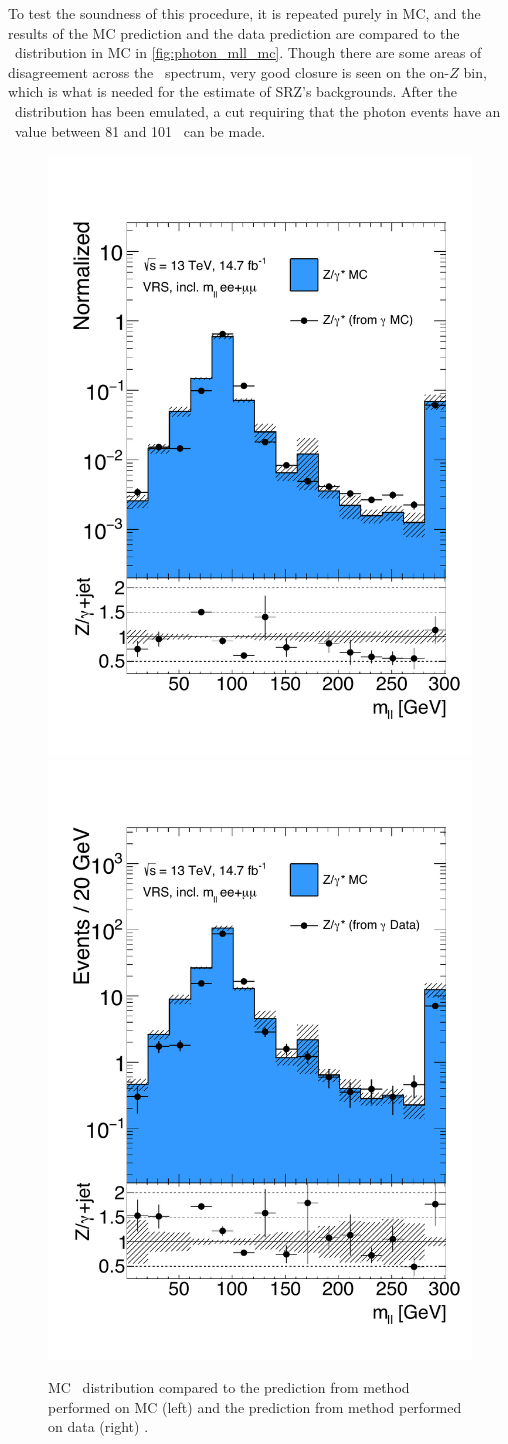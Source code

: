 To test the soundness of this procedure, it is repeated purely in \ac{MC}, and the results of the \ac{MC} prediction and the data prediction are compared to the \mll~distribution in \dyjets \ac{MC} in \autoref{fig:photon_mll_mc}. Though there are some areas of disagreement across the \mll~spectrum, very good closure is seen on the on-$Z$ bin, which is what is needed for the estimate of SRZ's backgrounds. After the \mll~distribution has been emulated, a cut requiring that the photon events have an \mll~value between 81 and 101 \gev~can be made.

\begin{centering}
\begin{figure}[!hbt]
\myfloatalign
\includegraphics[width=.45\linewidth]{figures/photons/DataMC_GJ_ee+mm_zmet_GMC.pdf}
\includegraphics[width=.45\linewidth]{figures/photons/DataMC_GJ_ee+mm_zmet_ZMC.pdf}
\caption{\dyjets \ac{MC} \mll~distribution compared to the prediction from \gjets method performed on \ac{MC} (left) and the prediction from \gjets method performed on data (right) \cite{this_paper}. }
\label{fig:photon_mll_mc}
\end{figure}
\end{centering}

